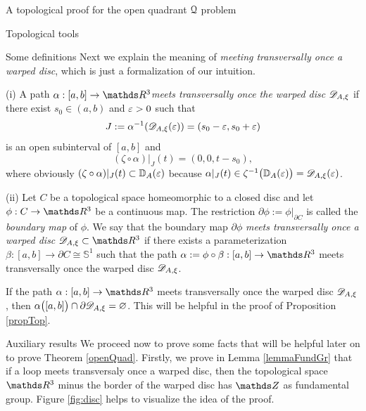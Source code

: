 \documentclass[11pt, a4paper, english, twoside, notitlepage, openright]{report}
\begin{document}
\begin{chapter}{A topological proof for the open quadrant $\mathcal{Q}$ problem}
\begin{section}{Topological tools}
\begin{subsection}{Some definitions}
Next we explain the meaning of \emph{meeting transversally once a warped disc}, which is just a formalization of our intuition.

\begin{definitions} \label{pathDefs1}

(i) A path $\alpha:[a,b]\to\R^3$\emph{meets transversally once the warped disc $\mathscr{D}_{A,\xi}$} if there exist $s_0\in(a,b)$ and $\varepsilon>0$ such that
$$
J:=\alpha^{-1}(\mathscr{D}_{A,\xi}(\varepsilon))=(s_0-\varepsilon,s_0+\varepsilon)
$$
is an open subinterval of $[a,b]$ and 
$$
(\zeta\circ\alpha)|_J(t)=(0,0,t-s_0),
$$
where obviously $(\zeta\circ\alpha)|_J(t)\subset\mathbb{D}_A(\varepsilon)$ because $\alpha|_J(t)\in\zeta^{-1}\big(\mathbb{D}_A(\varepsilon)\big) = \mathscr{D}_{A,\xi}(\varepsilon)$.

\vspace{1mm}

(ii) Let $C$ be a topological space homeomorphic to a closed disc and let $\phi:C\to\R^3$ be a continuous map. The restriction $\partial\phi:=\phi|_{\partial C}$ is called the \textit{boundary map} of $\phi$. We say that the boundary map $\partial\phi$ \emph{meets transversally once a warped disc} $\D_{A,\xi}\subset\R^3$ if there exists a parameterization $\beta:[a,b]\to\partial C\cong\mathbb{S}^1$ such that the path $\alpha:=\phi\circ\beta:[a,b]\to\R^3$ meets transversally once the warped disc $\mathscr{D}_{A,\xi}$.
\end{definitions}


\begin{remark}\label{remPath}
If the path $\alpha:[a,b]\to\R^3$ meets transversally once the warped disc $\mathscr{D}_{A,\xi}$, then $\alpha\big([a,b]\big)\cap\partial\mathscr{D}_{A,\xi}=\varnothing$. This will be helpful in the proof of Proposition \ref{propTop}.
\end{remark}
\end{subsection}

\begin{subsection}{Auxiliary results}
We proceed now to prove some facts that will be helpful later on to prove Theorem \ref{openQuad}. Firstly, we prove in Lemma \ref{lemmaFundGr} that if a loop meets transversaly once a warped disc, then the topological space $\R^3$ minus the border of the warped disc has $\Z$ as fundamental group. Figure \ref{fig:disc} helps to visualize the idea of the proof.


\end{subsection}
\end{section}
\end{chapter}
\end{document}
